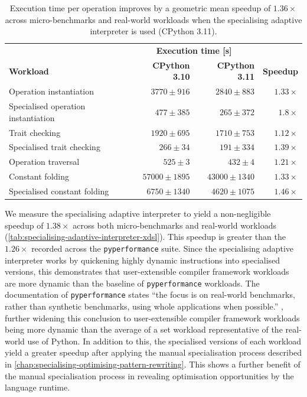 \begin{table}[H]
  \caption{Execution time per operation improves by a geometric mean speedup of $1.36\times$ across micro-benchmarks and real-world workloads when the specialising adaptive interpreter is used (CPython 3.11).}
  \label{tab:specialising-adaptive-interpreter-xdsl}
  \centering
  \begin{tabular}{lrrr}
    \toprule
    & \multicolumn{2}{c}{\textbf{Execution time [s]}} \\
    \cmidrule(r){2-3}
    \textbf{Workload}& \textbf{CPython 3.10} & \textbf{CPython 3.11} & \textbf{Speedup} \\
    \midrule
    Operation instantiation & $3770 \pm 916$ & $2840 \pm 883$ & $1.33\times$ \\
    Specialised operation instantiation & $477 \pm 385$ & $265 \pm 372$ & $1.8\times$ \\
    Trait checking & $1920 \pm 695$ & $1710 \pm 753$ & $1.12\times$ \\
    Specialised trait checking & $266 \pm 34$ & $191 \pm 334$ & $1.39\times$ \\
    Operation traversal & $525 \pm 3$ & $432 \pm 4$ & $1.21\times$ \\
    Constant folding & $57000 \pm 1895$ & $43000 \pm 1340$ & $1.33\times$ \\
    Specialised constant folding & $6750 \pm 1340$ & $4620 \pm 1075$ & $1.46\times$ \\
    \bottomrule
  \end{tabular}
\end{table}


We measure the specialising adaptive interpreter to yield a non-negligible speedup of $1.38\times$ across both micro-benchmarks and real-world workloads (\autoref{tab:specialising-adaptive-interpreter-xdsl}).
This speedup is greater than the $1.26\times$ recorded across the \texttt{pyperformance} suite. Since the specialising adaptive interpreter works by quickening highly dynamic instructions into specialised versions, this demonstrates that user-extensible compiler framework workloads are more dynamic than the baseline of \texttt{pyperformance} workloads.
The documentation of \texttt{pyperformance} states ``the focus is on real-world benchmarks, rather than synthetic benchmarks, using whole applications when possible.'' \cite{collinwinterPythonPyperformance2025}, further widening this conclusion to user-extensible compiler framework workloads being more dynamic than the average of a set workload representative of the real-world use of Python.
In addition to this, the specialised versions of each workload yield a greater speedup after applying the manual specialisation process described in \autoref{chap:specialising-optimising-pattern-rewriting}. This shows a further benefit of the manual specialisation process in revealing optimisation opportunities by the language runtime.

